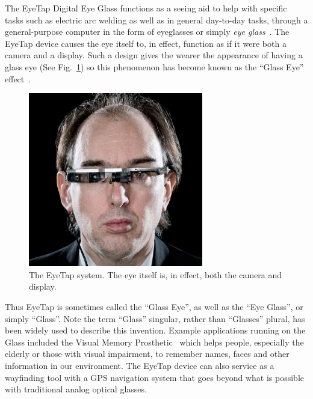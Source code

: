 The EyeTap Digital Eye Glass functions as a seeing aid to help with specific tasks such as electric arc 
welding as well as in general day-to-day tasks, through a general-purpose computer in the form of 
eyeglasses or simply \emph{eye glass}~\cite{intelligentimageprocessing}. The EyeTap device causes 
the eye itself to, in effect, function as if it were both a camera and a display. Such a design gives the 
wearer the appearance of having a glass eye (See Fig.~\ref{fig:eyetap_mann_black}) so this 
phenomenon has become known as the ``Glass Eye'' effect~\cite{mann260}. 

\begin{figure}
  \center
  \includegraphics[width=3.0in]{ch1/figures/eyetap.jpg}
  \caption{The EyeTap system. The eye itself is, in effect, both the camera and display.}
  \label{fig:eyetap_mann_black}
\end{figure}

Thus EyeTap is sometimes called the ``Glass Eye'', as well as the ``Eye Glass'', or simply ``Glass''. 
Note the term ``Glass'' singular, rather than ``Glasses'' plural, has been widely used to describe this 
invention. Example applications running on the Glass included the Visual Memory 
Prosthetic~\cite{mannaaai361} which helps people, especially the elderly or those with visual 
impairment, to remember names, faces and other information in our environment. The EyeTap device 
can also service as a wayfinding tool with a GPS navigation system that goes beyond what is possible 
with traditional analog optical glasses. 

